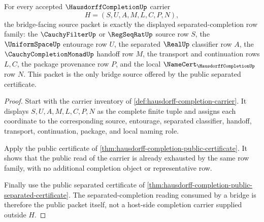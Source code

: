 \begin{theorem}
\label{thm:hausdorff-completion-standard-bridge-source-packet}
For every accepted $\HausdorffCompletionUp$ carrier
$$
H=(S,U,A,M,L,C,P,N),
$$
the bridge-facing source packet is exactly the displayed separated-completion row family: the $\CauchyFilterUp$ or $\RegSeqRatUp$ source row $S$, the $\UniformSpaceUp$ entourage row $U$, the separated $\RealUp$ classifier row $A$, the $\CauchyCompletionMonadUp$ handoff row $M$, the transport and continuation rows $L,C$, the package provenance row $P$, and the local $\NameCert_{\HausdorffCompletionUp}$ row $N$. This packet is the only bridge source offered by the public separated certificate.
\end{theorem}
\begin{proof}
Start with the carrier inventory of \autoref{def:hausdorff-completion-carrier}. It displays $S,U,A,M,L,C,P,N$ as the complete finite tuple and assigns each coordinate to the corresponding source, entourage, separated classifier, handoff, transport, continuation, package, and local naming role.

Apply the public certificate of \autoref{thm:hausdorff-completion-public-certificate}. It shows that the public read of the carrier is already exhausted by the same row family, with no additional completion object or representative row.

Finally use the public separated certificate of \autoref{thm:hausdorff-completion-public-separated-certificate}. The separated-completion reading consumed by a bridge is therefore the public packet itself, not a host-side completion carrier supplied outside $H$.
\end{proof}

